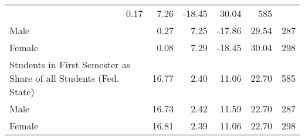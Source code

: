 \documentclass{article}
\begin{document}
\begin{table}[ht]
{\begin{tabular}{llllll}
  \multicolumn{1}{r}{0.17} &
  \multicolumn{1}{r}{7.26} &
  \multicolumn{1}{r}{-18.45} &
  \multicolumn{1}{r}{30.04} &
  \multicolumn{1}{r}{585} \\
\multicolumn{1}{l}{\hspace{1em}Male} &
  \multicolumn{1}{r}{0.27} &
  \multicolumn{1}{r}{7.25} &
  \multicolumn{1}{r}{-17.86} &
  \multicolumn{1}{r}{29.54} &
  \multicolumn{1}{r}{287} \\
\multicolumn{1}{l}{\hspace{1em}Female} &
  \multicolumn{1}{r}{0.08} &
  \multicolumn{1}{r}{7.29} &
  \multicolumn{1}{r}{-18.45} &
  \multicolumn{1}{r}{30.04} &
  \multicolumn{1}{r}{298} \\
\multicolumn{1}{l}{Students in First Semester as Share of all Students (Fed. State)} &
  \multicolumn{1}{r}{16.77} &
  \multicolumn{1}{r}{2.40} &
  \multicolumn{1}{r}{11.06} &
  \multicolumn{1}{r}{22.70} &
  \multicolumn{1}{r}{585} \\
\multicolumn{1}{l}{\hspace{1em}Male} &
  \multicolumn{1}{r}{16.73} &
  \multicolumn{1}{r}{2.42} &
  \multicolumn{1}{r}{11.59} &
  \multicolumn{1}{r}{22.70} &
  \multicolumn{1}{r}{287} \\
\multicolumn{1}{l}{\hspace{1em}Female} &
  \multicolumn{1}{r}{16.81} &
  \multicolumn{1}{r}{2.39} &
  \multicolumn{1}{r}{11.06} &
  \multicolumn{1}{r}{22.70} &
  \multicolumn{1}{r}{298} \\
\bottomrule
\end{tabular}}
\end{table}
\end{document}
